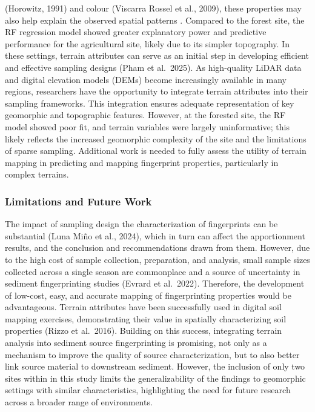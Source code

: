 \documentclass[
  number]{elsarticle}
\begin{document}
(Horowitz, 1991) and colour (Viscarra Rossel et al., 2009), these
properties may also help explain the observed spatial patterns .
Compared to the forest site, the RF regression model showed greater
explanatory power and predictive performance for the agricultural site,
likely due to its simpler topography. In these settings, terrain
attributes can serve as an initial step in developing efficient and
effective sampling designs (Pham et al.~2025). As high-quality LiDAR
data and digital elevation models (DEMs) become increasingly available
in many regions, researchers have the opportunity to integrate terrain
attributes into their sampling frameworks. This integration ensures
adequate representation of key geomorphic and topographic features.
However, at the forested site, the RF model showed poor fit, and terrain
variables were largely uninformative; this likely reflects the increased
geomorphic complexity of the site and the limitations of sparse
sampling. Additional work is needed to fully assess the utility of
terrain mapping in predicting and mapping fingerprint properties,
particularly in complex terrains.

\subsubsection{Limitations and Future
Work}\label{limitations-and-future-work}

The impact of sampling design the characterization of fingerprints can
be substantial (Luna Miño et al., 2024), which in turn can affect the
apportionment results, and the conclusion and recommendations drawn from
them. However, due to the high cost of sample collection, preparation,
and analysis, small sample sizes collected across a single season are
commonplace and a source of uncertainty in sediment fingerprinting
studies (Evrard et al.~2022). Therefore, the development of low-cost,
easy, and accurate mapping of fingerprinting properties would be
advantageous. Terrain attributes have been successfully used in digital
soil mapping exercises, demonstrating their value in spatially
characterizing soil properties (Rizzo et al.~2016). Building on this
success, integrating terrain analysis into sediment source
fingerprinting is promising, not only as a mechanism to improve the
quality of source characterization, but to also better link source
material to downstream sediment. However, the inclusion of only two
sites within in this study limits the generalizability of the findings
to geomorphic settings with similar characteristics, highlighting the
need for future research across a broader range of environments.
\end{document}
